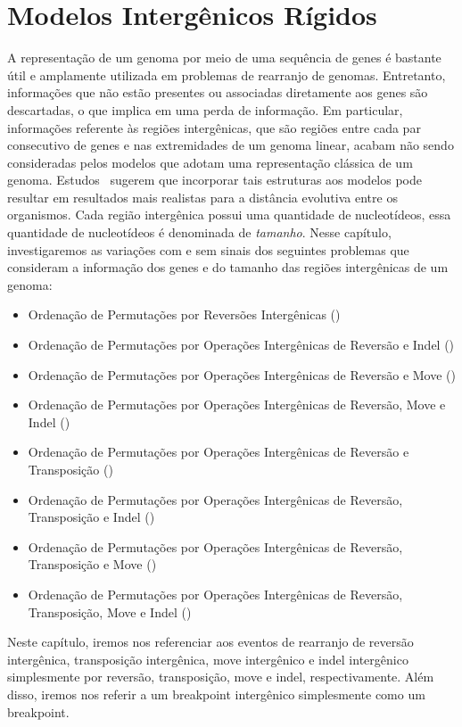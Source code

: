 \chapter{Modelos Intergênicos Rígidos}\label{chapter:DOVAEMLI}

A representação de um genoma por meio de uma sequência de genes é bastante útil e amplamente utilizada em problemas de rearranjo de genomas. Entretanto, informações que não estão presentes ou associadas diretamente aos genes são descartadas, o que implica em uma perda de informação. Em particular, informações referente às regiões intergênicas, que são regiões entre cada par consecutivo de genes e nas extremidades de um genoma linear, acabam não sendo consideradas pelos modelos que adotam uma representação clássica de um genoma. Estudos~\cite{2016a-biller-etal, 2016b-biller-etal} sugerem que incorporar tais estruturas aos modelos pode resultar em resultados mais realistas para a distância evolutiva entre os organismos. Cada região intergênica possui uma quantidade de nucleotídeos, essa quantidade de nucleotídeos é denominada de \emph{tamanho}. Nesse capítulo, investigaremos as variações com e sem sinais dos seguintes problemas que consideram a informação dos genes e do tamanho das regiões intergênicas de um genoma:

\begin{itemize}
  \item Ordenação de Permutações por Reversões Intergênicas (\SbIR)
  \item Ordenação de Permutações por Operações Intergênicas de Reversão e Indel (\SbIRI)
  \item Ordenação de Permutações por Operações Intergênicas de Reversão e Move \break (\SbIRM)
  \item Ordenação de Permutações por Operações Intergênicas de Reversão, Move e Indel (\SbIRMI)
  \item Ordenação de Permutações por Operações Intergênicas de Reversão e Transposição (\SbIRT)
  \item Ordenação de Permutações por Operações Intergênicas de Reversão, Transposição e Indel (\SbIRTI)
  \item Ordenação de Permutações por Operações Intergênicas de Reversão, Transposição e Move (\SbIRTM)
  \item Ordenação de Permutações por Operações Intergênicas de Reversão, Transposição, Move e Indel (\SbIRTMI)
\end{itemize}

Neste capítulo, iremos nos referenciar aos eventos de rearranjo de reversão intergênica, transposição intergênica, move intergênico e indel intergênico simplesmente por reversão, transposição, move e indel, respectivamente. Além disso, iremos nos referir a um breakpoint intergênico simplesmente como um breakpoint.

